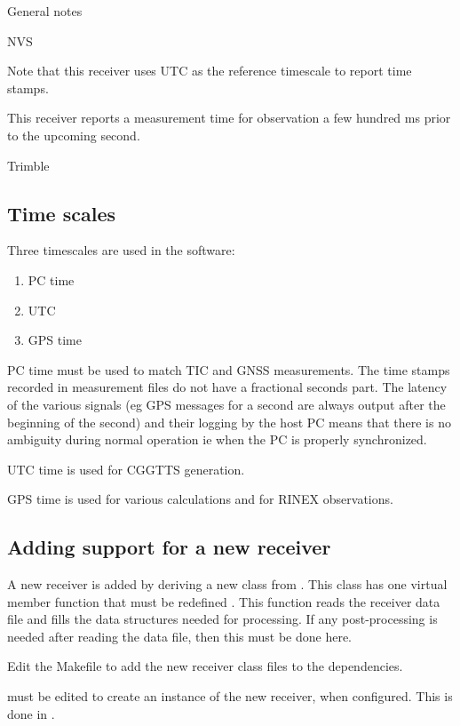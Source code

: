 
General notes

NVS

Note that this receiver uses UTC as the reference timescale to report time stamps.

This receiver reports a measurement time for observation a few hundred ms prior to the upcoming
second.

Trimble

 

\subsection{Time scales}

Three timescales are used in the software:
\begin{enumerate}
\item PC time
\item UTC
\item GPS time
\end{enumerate}

PC time must be used to match TIC and GNSS measurements. The time stamps recorded in measurement files do
not have a fractional seconds part. The latency of the various signals (eg GPS messages 
for a second are always output after the beginning of the second) and their logging by the host PC 
means that there is no ambiguity during normal operation ie when the PC is properly synchronized.

UTC time is used for CGGTTS generation.

GPS time is used for various calculations and for RINEX observations.

\subsection{Adding support for a new receiver}

A new receiver is added by deriving a new class from . This class has one virtual member
function that must be redefined . This function reads the receiver data file and fills
the data structures needed for processing. If any post-processing is needed after reading the data file, then this 
must be done here.

Edit the Makefile to add the new receiver class files to the dependencies.

 must be edited to create an instance of the new receiver, when configured.
This is done in .

